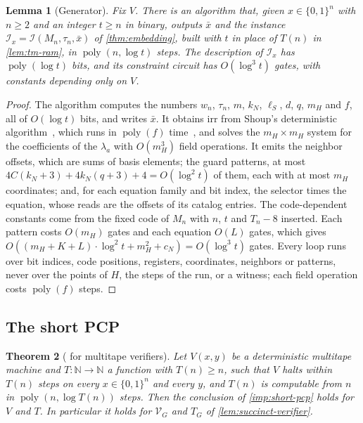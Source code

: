 \documentclass[11pt,letterpaper]{article}
\newtheorem{theorem}{Theorem}[section]
\newtheorem{lemma}[theorem]{Lemma}
\theoremstyle{definition}
\theoremstyle{remark}
\newcommand{\N}{\mathbb N}
\newcommand{\poly}{\operatorname{poly}}
\begin{document}
\begin{lemma}[Generator]\label{lem:generator}
Fix \(V\). There is an algorithm that, given \(x\in\{0,1\}^n\) with
\(n\ge2\) and an integer \(t\ge n\) in binary, outputs \(\bar x\) and
the instance \(\mathcal I_x=\mathcal I(M_n,\tau_n,\bar x)\) of
\cref{thm:embedding}, built with \(t\) in place of \(T(n)\) in
\cref{lem:tm-ram}, in \(\poly(n,\log t)\) steps. The description of
\(\mathcal I_x\) has \(\poly(\log t)\) bits, and its constraint circuit
has \(O(\log^3t)\) gates, with constants depending only on \(V\).
\end{lemma}
\begin{proof}
The algorithm computes the numbers \(w_n\), \(\tau_n\), \(m\), \(k_N\),
\(\ell_S\), \(d\), \(q\), \(m_H\) and \(f\), all of \(O(\log t)\) bits, and
writes \(\bar x\). It obtains \(\mathrm{irr}\) from Shoup's deterministic
algorithm~\cite[Corollary~3.2]{Sho88}, which runs in \(\poly(f)\)
time~\cite[Algorithm~17]{BCGT13}, and solves the \(m_H\times m_H\) system
for the coefficients of the \(\lambda_a\) with \(O(m_H^3)\) field
operations. It emits the neighbor offsets, which are sums of basis
elements; the guard patterns, at most
\(4C(k_N+3)+4k_N(q+3)+4=O(\log^2t)\) of them, each with at most \(m_H\)
coordinates; and, for each equation family and bit index, the selector
times the equation, whose reads are the offsets of its catalog
entries. The code-dependent constants come from the fixed code of
\(M_n\) with \(n\), \(t\) and \(T_n-8\) inserted. Each pattern costs
\(O(m_H)\) gates and each equation \(O(L)\) gates, which gives
\(O((m_H+K+L)\cdot\log^2t+m_H^2+c_N)=O(\log^3t)\) gates. Every loop
runs over bit indices, code positions, registers, coordinates, neighbors
or patterns, never over the points of \(H\), the steps of the run, or a
witness; each field operation costs \(\poly(f)\) steps.
\end{proof}

\subsection{The short PCP}

\begin{theorem}[ for multitape verifiers]
\label{thm:short-pcp-ours}
Let \(V(x,y)\) be a deterministic multitape machine and \(T:\N\to\N\) a
function with \(T(n)\ge n\), such that \(V\) halts within \(T(n)\) steps
on every \(x\in\{0,1\}^n\) and every \(y\), and \(T(n)\) is computable
from \(n\) in \(\poly(n,\log T(n))\) steps. Then the conclusion of
\cref{imp:short-pcp} holds for \(V\) and \(T\). In particular it holds
for \(\mathcal V_G\) and \(T_G\) of \cref{lem:succinct-verifier}.
\end{theorem}
\end{document}
